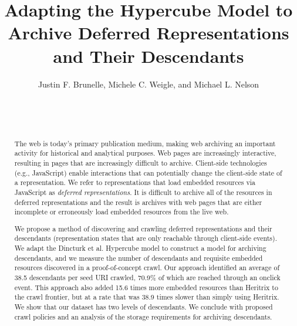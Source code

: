 \documentclass{sig-alternate}
\begin{document}
\title{Adapting the Hypercube Model to Archive Deferred Representations and Their Descendants}





\author{
\alignauthor
Justin F. Brunelle, Michele C. Weigle, and Michael L. Nelson\\
       \\
       \\
       \\
}




\maketitle
\begin{abstract}
The web is today's primary publication medium, making web archiving an important activity for historical and analytical purposes. Web pages are increasingly interactive, resulting in pages that are increasingly difficult to archive. Client-side technologies (e.g., JavaScript) enable interactions that can potentially change the client-side state of a representation. %
We refer to representations that load embedded resources via JavaScript as \emph{deferred representations}. It is difficult to archive all of the resources in deferred representations and the result is archives with web pages that are either incomplete or erroneously load embedded resources from the live web.


We propose a method of discovering and crawling deferred representations and their descendants (representation states that are only reachable through client-side events). We adapt the Dincturk et al. Hypercube model to construct a model for archiving descendants, and we measure the number of descendants and requisite embedded resources discovered in a proof-of-concept crawl. Our approach identified an average of 38.5 descendants per seed URI crawled, 70.9\% of which are reached through an onclick event. This approach also added 15.6 times more embedded resources than Heritrix to the crawl frontier, but at a rate that was 38.9 times slower than simply using Heritrix. We show that our dataset has two levels of descendants. We conclude with proposed crawl policies and an analysis of the storage requirements for archiving descendants.

\end{abstract}
\end{document}
